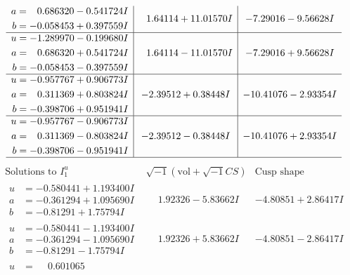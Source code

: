 \documentclass[1p]{elsarticle_modified}
\theoremstyle{definition}
\newcommand{\I}{\sqrt{-1}}
\begin{document}
$$\begin{array}{c|c|c}
\begin{aligned}
a &= \phantom{-}0.686320 - 0.541724 I \\
b &= -0.058453 + 0.397559 I\end{aligned}
 & \phantom{-}1.64114 + 11.01570 I & -7.29016 - 9.56628 I \\ \hline\begin{aligned}
u &= -1.289970 - 0.199680 I \\
a &= \phantom{-}0.686320 + 0.541724 I \\
b &= -0.058453 - 0.397559 I\end{aligned}
 & \phantom{-}1.64114 - 11.01570 I & -7.29016 + 9.56628 I \\ \hline\begin{aligned}
u &= -0.957767 + 0.906773 I \\
a &= \phantom{-}0.311369 + 0.803824 I \\
b &= -0.398706 + 0.951941 I\end{aligned}
 & -2.39512 + 0.38448 I & -10.41076 - 2.93354 I \\ \hline\begin{aligned}
u &= -0.957767 - 0.906773 I \\
a &= \phantom{-}0.311369 - 0.803824 I \\
b &= -0.398706 - 0.951941 I\end{aligned}
 & -2.39512 - 0.38448 I & -10.41076 + 2.93354 I\\
 \hline 
 \end{array}$$\newpage$$\begin{array}{c|c|c}  
\text{Solutions to }I^u_{1}& \I (\text{vol} + \sqrt{-1}CS) & \text{Cusp shape}\\
 \hline 
\begin{aligned}
u &= -0.580441 + 1.193400 I \\
a &= -0.361294 + 1.095690 I \\
b &= -0.81291 + 1.75794 I\end{aligned}
 & \phantom{-}1.92326 - 5.83662 I & -4.80851 + 2.86417 I \\ \hline\begin{aligned}
u &= -0.580441 - 1.193400 I \\
a &= -0.361294 - 1.095690 I \\
b &= -0.81291 - 1.75794 I\end{aligned}
 & \phantom{-}1.92326 + 5.83662 I & -4.80851 - 2.86417 I \\ \hline\begin{aligned}
u &= \phantom{-}0.601065\phantom{ +0.000000I} \\

\end{aligned}
\end{array}$$
\end{document}
